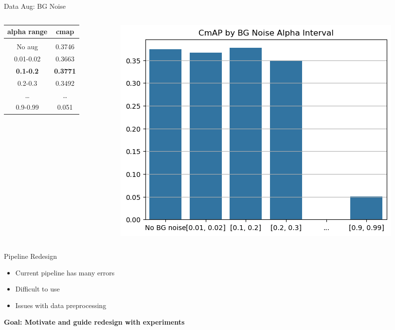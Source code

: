 \begin{frame}{Data Aug: BG Noise}
    \begin{columns}
        \begin{column}{0.5\textwidth}
            \centering
            \begin{tabular}{c|c}
                alpha range & cmap \\
                \hline \\
                No aug & 0.3746 \\
                0.01-0.02 & 0.3663 \\
            \textbf{0.1-0.2} & \textbf{0.3771} \\
                0.2-0.3 & 0.3492 \\
                \dots & \dots \\
                0.9-0.99 & 0.051
            \end{tabular}
        \end{column}
        \begin{column}{0.5\textwidth}
            \includegraphics[width=\textwidth]{images/cmap_by_bgnoise.png}
        \end{column}
    \end{columns}
\end{frame}

\begin{frame}{Pipeline Redesign}
    \begin{itemize}
        \item Current pipeline has many errors
        \item Difficult to use
        \item Issues with data preprocessing
    \end{itemize}
    \begin{center}
        \textbf{Goal: Motivate and guide redesign with experiments}
    \end{center}
\end{frame}


